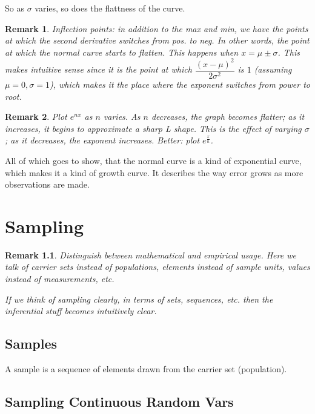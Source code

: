\documentclass[reqno,12pt]{tufte-book}
\numberwithin{equation}{subsection}
\newtheorem{remark}{Remark}
\begin{document}
So as $\sigma$ varies, so does the flattness of the curve.

\begin{remark}
  Inflection points: in addition to the max and min, we have the
  points at which the second derivative switches from pos. to neg.  In
  other words, the point at which the normal curve starts to flatten.
  This happens when $x=\mu\pm\sigma$.  This makes intuitive sense
  since it is the point at which $\dfrac{(x-\mu)^2}{2\sigma^2}$ is $1$
  (assuming $\mu=0, \sigma=1$), which makes it the place where the
  exponent switches from power to root.
\end{remark}

\begin{remark}
  Plot $e^{nx}$ as $n$ varies.  As $n$ decreases, the graph becomes
  flatter; as it increases, it begins to approximate a sharp L shape.
  This is the effect of varying $\sigma$; as it decreases, the
  exponent increases.  Better: plot $e^{\frac{x}{n}}$.
\end{remark}

All of which goes to show, that the normal curve is a kind of
exponential curve, which makes it a kind of growth curve.  It
describes the way error grows as more observations are made.


\chapter{Sampling}

\begin{remark}
  Distinguish between mathematical and empirical usage.  Here we talk
  of carrier sets instead of populations, elements instead of sample
  units, values instead of measurements, etc.

  If we think of sampling clearly, in terms of sets, sequences,
  etc. then the inferential stuff becomes intuitively clear.
\end{remark}

\section{Samples}

A sample is a sequence of elements drawn from the carrier set (population).

\section{Sampling Continuous Random Vars}
\end{document}
